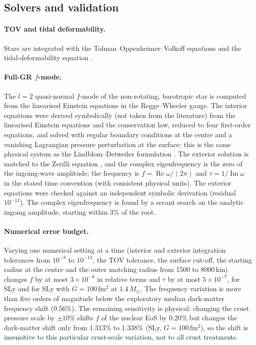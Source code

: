 \documentclass[11pt,a4paper]{article}
\newcommand{\Msun}{M_\odot}
\begin{document}
\subsection{Solvers and validation}\label{sec:solver}
\paragraph{TOV and tidal deformability.} Stars are integrated with the Tolman--Oppenheimer--Volkoff equations \citep{Tolman39,OV39} and the tidal-deformability equation \citep{Hinderer08}.
\paragraph{Full-GR $f$-mode.} The $l=2$ quasi-normal $f$-mode of the non-rotating, barotropic star is computed from the linearised Einstein equations in the Regge--Wheeler gauge. The interior equations were derived symbolically (not taken from the literature) from the linearised Einstein equations and the conservation law, reduced to four first-order equations, and solved with regular boundary conditions at the centre and a vanishing Lagrangian pressure perturbation at the surface; this is the same physical system as the Lindblom--Detweiler formulation \citep{DL85}. The exterior solution is matched to the Zerilli equation \citep{Zerilli70}, and the complex eigenfrequency is the zero of the ingoing-wave amplitude; the frequency is $f=\operatorname{Re}\omega/(2\pi)$ and $\tau=1/\operatorname{Im}\omega$ in the stated time convention (with consistent physical units). The exterior equations were checked against an independent symbolic derivation (residual $10^{-12}$). The complex eigenfrequency is found by a secant search on the analytic ingoing amplitude, starting within 3\% of the root.
\paragraph{Numerical error budget.} Varying one numerical setting at a time (interior and exterior integration tolerances from $10^{-8}$ to $10^{-13}$, the TOV tolerance, the surface cut-off, the starting radius at the centre and the outer matching radius from 1500 to 8000\,km) changes $f$ by at most $3\times10^{-8}$ in relative terms and $\tau$ by at most $5\times10^{-7}$, for SLy and for SLy with $G=100$\,fm$^2$ at $1.4\,\Msun$. The frequency variation is more than five orders of magnitude below the exploratory median dark-matter frequency shift (0.56\%). The remaining sensitivity is physical: changing the crust pressure scale by $\pm10\%$ shifts $f$ of the nuclear EoS by 0.20\% but changes the dark-matter shift only from 1.313\% to 1.338\% (SLy, $G=100$\,fm$^2$), so the shift is insensitive to this particular crust-scale variation, not to all crust treatments.
\end{document}

